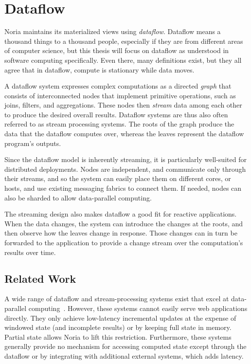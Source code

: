 \section{Dataflow}

Noria maintains its materialized views using \textit{dataflow}. Dataflow means a
thousand things to a thousand people, especially if they are from different
areas of computer science, but this thesis will focus on dataflow as understood
in software computing specifically. Even there, many definitions exist, but they
all agree that in dataflow, compute is stationary while data moves.

A dataflow system expresses complex computations as a directed \emph{graph} that
consists of interconnected nodes that implement primitive operations, such as
joins, filters, and aggregations. These nodes then \emph{stream} data among each
other to produce the desired overall results. Dataflow systems are thus also
often referred to as stream processing systems. The roots of the graph produce
the data that the dataflow computes over, whereas the leaves represent the
dataflow program's outputs.

Since the dataflow model is inherently streaming, it is particularly well-suited
for distributed deployments. Nodes are independent, and communicate only through
their streams, and so the system can easily place them on different cores, or
hosts, and use existing messaging fabrics to connect them. If needed, nodes can
also be sharded to allow data-parallel computing.

The streaming design also makes dataflow a good fit for reactive applications.
When the data changes, the system can introduce the changes at the roots, and
then observe how the leaves change in response. Those changes can in turn be
forwarded to the application to provide a change stream over the computation's
results over time.

\subsection*{Related Work}

A wide range of dataflow and stream-processing systems exist that excel at
data-parallel computing~\cite{dryad, naiad, storm, heron, flink, millwheel,
spark-streaming, stanford-stream, s-store, cloud-dataflow}. However, these
systems cannot easily serve web applications directly. They only achieve
low-latency incremental updates at the expense of windowed state (and incomplete
results) or by keeping full state in memory. Partial state allows Noria to lift
this restriction. Furthermore, these systems generally provide no mechanism for
accessing computed state except through the dataflow or by integrating with
additional external systems, which adds latency.

